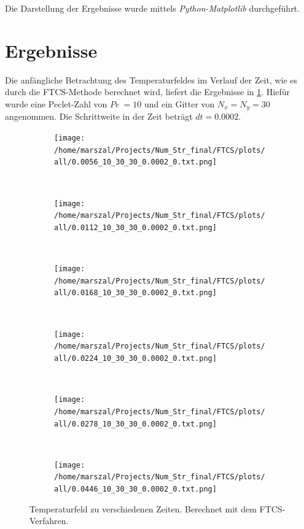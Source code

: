 Die Darstellung der Ergebnisse wurde mittels \emph{Python-Matplotlib} durchgeführt.


\FloatBarrier
\newpage
\section{Ergebnisse}
Die anfängliche Betrachtung des Temperaturfeldes im Verlauf der Zeit, wie es durch die FTCS-Methode berechnet wird, liefert die Ergebnisse in \cref{fig:FTCSnaive}. Hiefür wurde eine Peclet-Zahl von $Pe~=10$ und ein Gitter von $N_x=N_y=30$ angenommen. Die Schrittweite in der Zeit beträgt $dt=0.0002$.

\begin{figure}
\centering
  \begin{subfigure}[b]{0.35\textwidth}
    \texttt{[image: /home/marszal/Projects/Num\_Str\_final/FTCS/plots/all/0.0056\_10\_30\_30\_0.0002\_0.txt.png]}
  \end{subfigure}
  ~
  \begin{subfigure}[b]{0.35\textwidth}
    \texttt{[image: /home/marszal/Projects/Num\_Str\_final/FTCS/plots/all/0.0112\_10\_30\_30\_0.0002\_0.txt.png]}
  \end{subfigure}
  \\
  \begin{subfigure}[b]{0.35\textwidth}
    \texttt{[image: /home/marszal/Projects/Num\_Str\_final/FTCS/plots/all/0.0168\_10\_30\_30\_0.0002\_0.txt.png]}
  \end{subfigure}
  ~
  \begin{subfigure}[b]{0.35\textwidth}
    \texttt{[image: /home/marszal/Projects/Num\_Str\_final/FTCS/plots/all/0.0224\_10\_30\_30\_0.0002\_0.txt.png]}
  \end{subfigure}
  \\
  \begin{subfigure}[b]{0.35\textwidth}
    \texttt{[image: /home/marszal/Projects/Num\_Str\_final/FTCS/plots/all/0.0278\_10\_30\_30\_0.0002\_0.txt.png]}
  \end{subfigure}
  ~
  \begin{subfigure}[b]{0.35\textwidth}
    \texttt{[image: /home/marszal/Projects/Num\_Str\_final/FTCS/plots/all/0.0446\_10\_30\_30\_0.0002\_0.txt.png]}
  \end{subfigure}
\caption{Temperaturfeld zu verschiedenen Zeiten. Berechnet mit dem FTCS-Verfahren.}\label{fig:FTCSnaive}
\end{figure}
\FloatBarrier
\newpage
